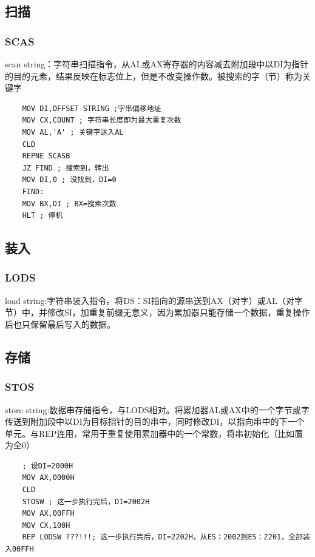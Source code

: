 \subsection{扫描}
\subsubsection{SCAS}
scan string：字符串扫描指令，从AL或AX寄存器的内容减去附加段中以DI为指针的目的元素，结果反映在标志位上，但是不改变操作数。被搜索的字（节）称为关键字
\begin{lstlisting}
    MOV DI,OFFSET STRING ;字串偏移地址
    MOV CX,COUNT ; 字符串长度即为最大重复次数
    MOV AL,'A' ; 关键字送入AL
    CLD
    REPNE SCASB 
    JZ FIND ; 搜索到，转出
    MOV DI,0 ; 没找到，DI=0
    FIND:
    MOV BX,DI ; BX=搜索次数
    HLT ; 停机
\end{lstlisting}
\subsection{装入}
\subsubsection{LODS}
load string:字符串装入指令。将DS：SI指向的源串送到AX（对字）或AL（对字节）中，并修改SI，加重复前缀无意义，因为累加器只能存储一个数据，重复操作后也只保留最后写入的数据。
\subsection{存储}
\subsubsection{STOS}
store string:数据串存储指令，与LODS相对。将累加器AL或AX中的一个字节或字传送到附加段中以DI为目标指针的目的串中，同时修改DI，以指向串中的下一个单元。与REP连用，常用于重复使用累加器中的一个常数，将串初始化（比如置为全0）
\begin{lstlisting}
    ; 设DI=2000H 
    MOV AX,0000H 
    CLD 
    STOSW ; 这一步执行完后，DI=2002H
    MOV AX,00FFH
    MOV CX,100H
    REP LODSW ???!!!; 这一步执行完后，DI=2202H，从ES：2002到ES：2201，全部装入00FFH
\end{lstlisting}
